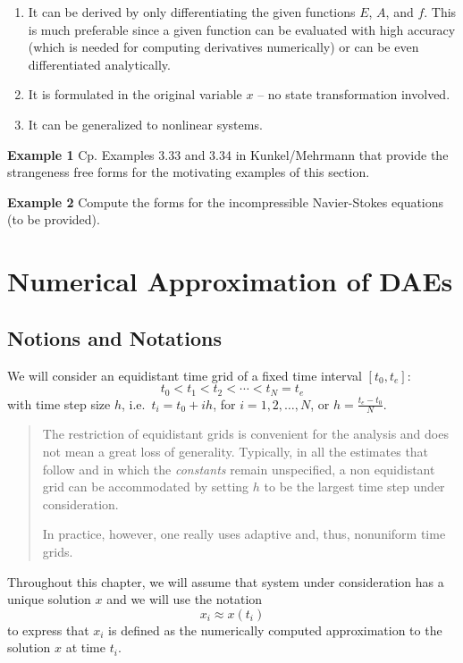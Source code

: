 \documentclass[]{book}
\newenvironment {JHSAYS} [0] {\begin{quote}\color{jhsc}} {\end{quote}}
\theoremstyle{definition}
\theoremstyle{definition}
\theoremstyle{definition}
\theoremstyle{definition}
\theoremstyle{remark}
\begin{document}
\begin{enumerate}
\def\labelenumi{\arabic{enumi}.}
\item
  It can be derived by only differentiating the given functions \(E\), \(A\), and \(f\). This is much preferable since a given function can be evaluated with high accuracy (which is needed for computing derivatives numerically) or can be even differentiated analytically.
\item
  It is formulated in the original variable \(x\) -- no state transformation involved.
\item
  It can be generalized to nonlinear systems.
\end{enumerate}

\textbf{Example 1} Cp. Examples 3.33 and 3.34 in Kunkel/Mehrmann that provide the strangeness free forms for the motivating examples of this section.

\textbf{Example 2} Compute the forms for the incompressible Navier-Stokes equations (to be provided).

\hypertarget{numerical-approximation-of-daes}{%
\chapter{Numerical Approximation of DAEs}\label{numerical-approximation-of-daes}}

\hypertarget{Vi}{%
\section{Notions and Notations}\label{Vi}}

We will consider an equidistant time grid of a fixed time interval \([t_0,t_e]\):
\[
t_0 < t_1 < t_2 < \dotsm < t_N=t_e
\]
with time step size \(h\), i.e.~\(t_i = t_0 + ih\), for \(i=1,2,\dotsc,N\), or \(h=\frac{t_e - t_0}{N}\).

\begin{JHSAYS}
The restriction of equidistant grids is convenient for the analysis and does not mean a great loss of generality. Typically, in all the estimates that follow and in which the \emph{constants} remain unspecified, a non equidistant grid can be accommodated by setting \(h\) to be the largest time step under consideration.

In practice, however, one really uses adaptive and, thus, nonuniform time grids.
\end{JHSAYS}

Throughout this chapter, we will assume that system under consideration has a unique solution \(x\) and we will use the notation
\[
x_i \approx x(t_i)
\]
to express that \(x_i\) is defined as the numerically computed approximation to the solution \(x\) at time \(t_i\).
\end{document}
